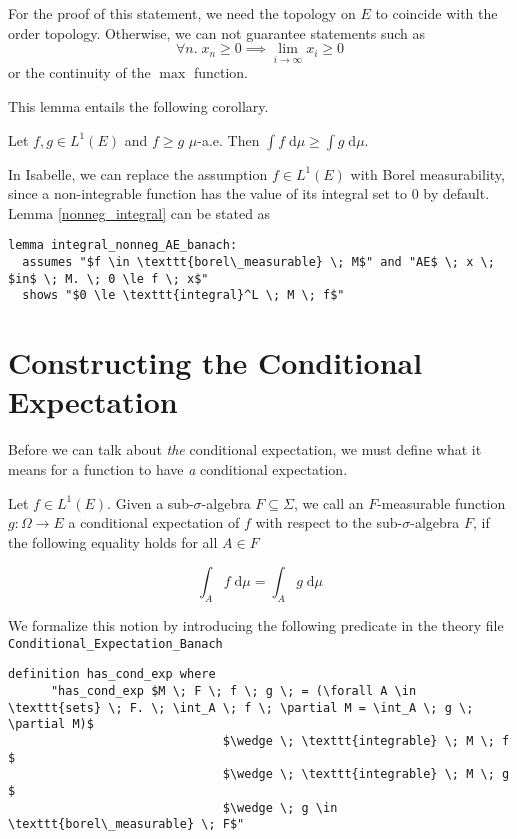 \begin{remark}
For the proof of this statement, we need the topology on $E$ to coincide with the order topology. Otherwise, we can not guarantee statements such as 
\[
	\forall n. \; x_n \ge 0 \implies \lim_{i \to \infty} x_i \ge 0
\]
or the continuity of the $\max$ function.
\end{remark}
This lemma entails the following corollary.
\begin{corollary}
	Let $f, g \in L^1(E)$ and $f \ge g$ $\mu$-a.e. Then $\int f\;\textrm{d} \mu \ge \int g\;\textrm{d} \mu$.
\end{corollary}

In Isabelle, we can replace the assumption $f \in L^1(E)$ with Borel measurability, since a non-integrable function has the value of its integral set to $0$ by default. Lemma \ref{nonneg_integral} can be stated as
{\small
\begin{lstlisting}[style=isabelle]
lemma integral_nonneg_AE_banach:
  assumes "$f \in \texttt{borel\_measurable} \; M$" and "AE$ \; x \; $in$ \; M. \; 0 \le f \; x$"
  shows "$0 \le \texttt{integral}^L \; M \; f$"
\end{lstlisting}
}

\section{Constructing the Conditional Expectation}

Before we can talk about \textit{the} conditional expectation, we must define what it means for a function to have \textit{a} conditional expectation. 

\begin{definition}
	Let $f \in L^1(E)$. Given a sub-$\sigma$-algebra $F \subseteq \Sigma$, we call an $F$-measurable function $g : \Omega \rightarrow E$ a conditional expectation of $f$ with respect to the sub-$\sigma$-algebra $F$, if the following equality holds for all $A \in F$

	\[
		\int_A f \; \textrm{d} \mu = \int_A g \; \textrm{d} \mu
	\]

\end{definition}

We formalize this notion by introducing the following predicate in the theory file \texttt{Conditional\_Expectation\_Banach} 

\begin{isadefinition}
{\small
\begin{lstlisting}[style=isabelle]
	definition has_cond_exp where 
	  "has_cond_exp $M \; F \; f \; g \; = (\forall A \in \texttt{sets} \; F. \; \int_A \; f \; \partial M = \int_A \; g \; \partial M)$
							  $\wedge \; \texttt{integrable} \; M \; f $
							  $\wedge \; \texttt{integrable} \; M \; g $
							  $\wedge \; g \in \texttt{borel\_measurable} \; F$"
\end{lstlisting}
}
\end{isadefinition}

